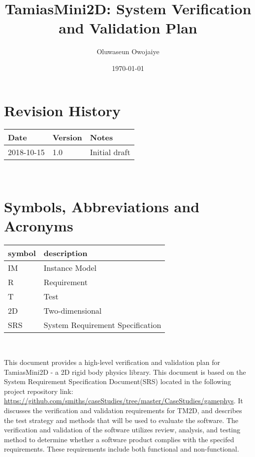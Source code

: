 \documentclass[12pt, titlepage]{article}
\begin{document}
\title{TamiasMini2D: System Verification and Validation Plan} 
\author{Oluwaseun Owojaiye}
\date{\today}
	
\maketitle


\section{Revision History}

\begin{tabularx}{\textwidth}{p{3cm}p{2cm}X}
\toprule {\bf Date} & {\bf Version} & {\bf Notes}\\
\midrule
2018-10-15 & 1.0 & Initial draft\\
\bottomrule
\end{tabularx}

~\newpage

\section{Symbols, Abbreviations and Acronyms}
\renewcommand{\arraystretch}{1.2}
\begin{tabular}{l l} 
  \toprule		
  \textbf{symbol} & \textbf{description}\\
  \midrule 
  IM & Instance Model\\
  R & Requirement\\
  T & Test\\
2D & Two-dimensional\\
SRS & System Requirement Specification\\
   \bottomrule
\end{tabular}\\


\newpage

\tableofcontents

\listoftables

\listoffigures

\newpage


This document provides a high-level verification and validation plan for TamiasMini2D - a 2D rigid body physics library. This document is based on the System Requirement Specification Document(SRS) located in the following project repository link: \url{https://github.com/smiths/caseStudies/tree/master/CaseStudies/gamephys}. It discusses the verification and validation requirements for TM2D, and describes the test strategy and methods that will be used to evaluate the software. The verification and validation of the software utilizes review, analysis, and testing method to determine whether a software product complies with the specifed requirements. These requirements include both functional and non-functional.
\end{document}
